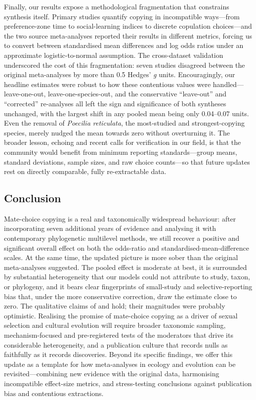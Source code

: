 Finally, our results expose a methodological fragmentation that constrains
synthesis itself. Primary studies quantify copying in incompatible ways---from
preference-zone time to social-learning indices to discrete copulation
choices---and the two source meta-analyses reported their results in different
metrics, forcing us to convert between standardised mean differences and log
odds ratios under an approximate logistic-to-normal assumption. The
cross-dataset validation underscored the cost of this fragmentation: seven
studies disagreed between the original meta-analyses by more than 0.5
Hedges' \textit{g} units. Encouragingly, our headline estimates were robust to
how these contentious values were handled---leave-one-out, leave-one-species-out,
and the conservative ``leave-out'' and ``corrected'' re-analyses all left the
sign and significance of both syntheses unchanged, with the largest shift in any
pooled mean being only 0.04--0.07 units. Even the removal of \textit{Poecilia
reticulata}, the most-studied and strongest-copying species, merely nudged the
mean towards zero without overturning it. The broader lesson, echoing
\textcite{daviesMetaanalysisFactorsInfluencing2020} and recent calls for
verification in our field, is that the community would benefit from minimum
reporting standards---group means, standard deviations, sample sizes, and raw
choice counts---so that future updates rest on directly comparable, fully
re-extractable data.

\subsection{Conclusion}

Mate-choice copying is a real and taxonomically widespread behaviour: after
incorporating seven additional years of evidence and analysing it with
contemporary phylogenetic multilevel methods, we still recover a positive and
significant overall effect on both the odds-ratio and standardised-mean-difference
scales. At the same time, the updated picture is more sober than the original
meta-analyses suggested. The pooled effect is moderate at best, it is surrounded
by substantial heterogeneity that our models could not attribute to study,
taxon, or phylogeny, and it bears clear fingerprints of small-study and
selective-reporting bias that, under the more conservative correction, draw the
estimate close to zero. The qualitative claims of
\textcite{jonesMechanismsSocialInfluence2019} and
\textcite{daviesMetaanalysisFactorsInfluencing2020} hold; their magnitudes were
probably optimistic. Realising the promise of mate-choice copying as a driver of
sexual selection and cultural evolution will require broader taxonomic sampling,
mechanism-focused and pre-registered tests of the moderators that drive its
considerable heterogeneity, and a publication culture that records nulls as
faithfully as it records discoveries. Beyond its specific findings, we offer this
update as a template for how meta-analyses in ecology and evolution can be
revisited---combining new evidence with the original data, harmonising
incompatible effect-size metrics, and stress-testing conclusions against
publication bias and contentious extractions.
